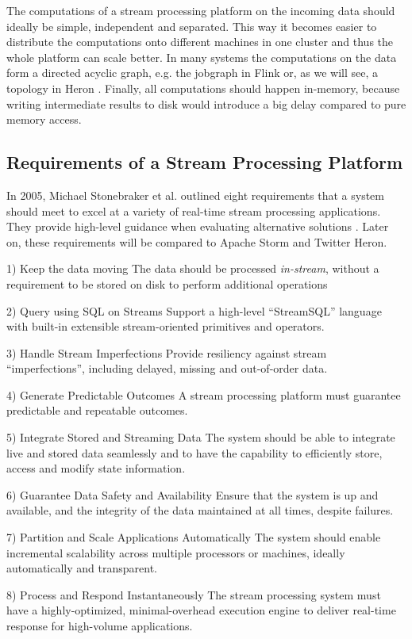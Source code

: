 \documentclass[conference]{IEEEtran}
\begin{document}
The computations of a stream processing platform on the incoming data should ideally be simple, independent and separated.
This way it becomes easier to distribute the computations onto different machines in one cluster and thus the whole platform can scale better.
In many systems the computations on the data form a directed acyclic graph, e.g. the jobgraph in Flink or, as we will see, a topology in Heron \cite{Flink}.
Finally, all computations should happen in-memory, because writing intermediate results to disk would introduce a big delay compared to pure memory access.

\subsection{Requirements of a Stream Processing Platform}
\label{sec:RequirementsOfAStreamProcessingPlatform}

In 2005, Michael Stonebraker et al. outlined eight requirements that a system should meet to excel at a variety of real-time stream processing applications.
They provide high-level guidance when evaluating alternative solutions \cite{The8Requirements}.
Later on, these requirements will be compared to Apache Storm and Twitter Heron.

\begin{LaTeXdescription}
  \item[1) Keep the data moving] The data should be processed \emph{in-stream}, without a requirement to be stored on disk to perform additional operations
  \item[2) Query using SQL on Streams] Support a high-level “StreamSQL” language with built-in extensible stream-oriented primitives and operators.
  \item[3) Handle Stream Imperfections] Provide resiliency against stream “imperfections”, including delayed, missing and out-of-order data.
  \item[4) Generate Predictable Outcomes] A stream processing platform must guarantee predictable and repeatable outcomes.
  \item[5) Integrate Stored and Streaming Data] The system should be able to integrate live and stored data seamlessly and to have the capability to efficiently store, access and modify state information.
  \item[6) Guarantee Data Safety and Availability] Ensure that the system is up and available, and the integrity of the data maintained at all times, despite failures.
  \item[7) Partition and Scale Applications Automatically] The system should enable incremental scalability across multiple processors or machines, ideally automatically and transparent.
  \item[8) Process and Respond Instantaneously] The stream processing system must have a highly-optimized, minimal-overhead execution engine to deliver real-time response for high-volume applications.
\end{LaTeXdescription}
\end{document}
